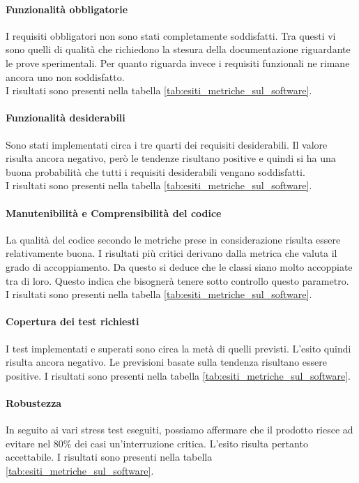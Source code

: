 \documentclass[../PianoDiQualifica.tex]{subfiles}
\begin{document}
\begin{appendices}
			\paragraph{Funzionalità obbligatorie}
			I requisiti obbligatori non sono stati completamente soddisfatti. Tra questi vi sono quelli di qualità che richiedono la stesura della documentazione riguardante le prove sperimentali. Per quanto riguarda invece i requisiti funzionali ne rimane ancora uno non soddisfatto.\\
			I risultati sono presenti nella tabella \ref{tab:esiti_metriche_sul_software}.
			
			\paragraph{Funzionalità desiderabili}
			Sono stati implementati circa i tre quarti dei requisiti desiderabili. Il valore risulta ancora negativo, però le tendenze risultano positive e quindi si ha una buona probabilità che tutti i requisiti desiderabili vengano soddisfatti.\\
			I risultati sono presenti nella tabella \ref{tab:esiti_metriche_sul_software}.
			
			\paragraph{Manutenibilità e Comprensibilità del codice}
			La qualità del codice secondo le metriche prese in considerazione risulta essere relativamente buona. I risultati più critici derivano dalla metrica che valuta il grado di accoppiamento. Da questo si deduce che le classi siano molto accoppiate tra di loro. Questo indica che bisognerà tenere sotto controllo questo parametro.\\
			I risultati sono presenti nella tabella \ref{tab:esiti_metriche_sul_software}.
			
			\paragraph{Copertura dei test richiesti}
			I test implementati e superati sono circa la metà di quelli previsti. L'esito quindi risulta ancora negativo. Le previsioni basate sulla tendenza risultano essere positive.  
			I risultati sono presenti nella tabella \ref{tab:esiti_metriche_sul_software}.
			
			\paragraph{Robustezza}
			In seguito ai vari stress test eseguiti, possiamo affermare che il prodotto riesce ad evitare nel 80\% dei casi un'interruzione critica. L'esito risulta pertanto accettabile.
			I risultati sono presenti nella tabella \ref{tab:esiti_metriche_sul_software}.
			

\end{appendices}
\end{document}
